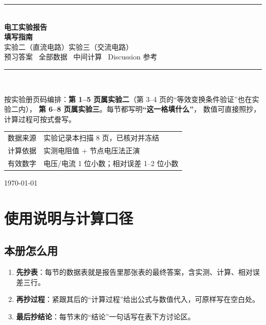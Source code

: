 \documentclass[UTF8,a4paper,10.5pt]{ctexart}
\newcommand{\key}[1]{\textbf{\color{acc}#1}}
\begin{document}
\begin{titlepage}
\centering
\vspace*{2.6cm}
{\color{acc}\rule{\linewidth}{1.1pt}}\\[0.85cm]
{\Huge\bfseries\color{acc} 电工实验报告\\[0.3cm] 填写指南}\\[0.55cm]
{\Large 实验二（直流电路）\quad\textbullet\quad 实验三（交流电路）}\\[0.3cm]
{\large 预习答案 \textbullet\ 全部数据 \textbullet\ 中间计算 \textbullet\ Discussion 参考}\\[0.65cm]
{\color{acc}\rule{\linewidth}{1.1pt}}\\[1.3cm]

\begin{minipage}{0.86\linewidth}
\large
按实验册页码编排：\textbf{第 1--5 页属实验二}（第 3--4 页的“等效变换条件验证”也在实验二内），
\textbf{第 6--8 页属实验三}。每节都写明\key{“这一格填什么”}，
数值可直接照抄，计算过程可按式誊写。

\vspace{0.45cm}
\normalsize
\begin{tabular}{@{}ll@{}}
\toprule
数据来源 & 实验记录本扫描 8 页，已核对并冻结 \\
计算依据 & 实测电阻值 + 节点电压法正演 \\
有效数字 & 电压/电流 1 位小数；相对误差 1--2 位小数 \\
\bottomrule
\end{tabular}
\end{minipage}

\vfill
{\small\color{gray} \today}
\end{titlepage}

\tableofcontents
\newpage

\section{使用说明与计算口径}

\subsection{本册怎么用}
\begin{enumerate}
  \item \key{先抄表}：每节的数据表就是报告里那张表的最终答案，含实测、计算、相对误差三行。
  \item \key{再抄过程}：紧跟其后的“计算过程”给出公式与数值代入，可原样写在空白处。
  \item \key{最后抄结论}：每节末的“结论”一句话写在表下方讨论区。
\end{enumerate}
\end{document}
